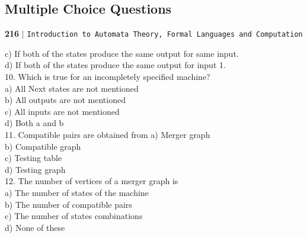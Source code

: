 \documentclass[8pt]{beamer}
\begin{document}
\begin{frame}
\section*{Multiple Choice Questions}
\begin{flushleft}
    \textbf{216}\hspace*{0.1cm} \textbf{$|$} \hspace*{0.1cm} \texttt{Introduction to Automata Theory, Formal Languages and Computation}
  \end{flushleft}

  \vspace*{0.5cm}
\begin{multicols}{2}
\hspace*{0.4cm} c) If both of the states produce the same
output for same input.\\
\hspace*{0.4cm} d) If both of the states produce the same
output for input 1.\\

\vspace*{0.3cm}
10. Which is true for an incompletely specified
machine?\\
\hspace*{0.4cm} a) All Next states are not mentioned\\
\hspace*{0.4cm} b) All outputs are not mentioned\\
\hspace*{0.4cm} c) All inputs are not mentioned\\
\hspace*{0.4cm} d) Both a and b\\

\vspace*{0.3cm}
11. Compatible pairs are obtained from
\hspace*{0.4cm} a) Merger graph\\
\hspace*{0.4cm} b) Compatible graph\\
\hspace*{0.4cm} c) Testing table\\
\hspace*{0.4cm} d) Testing graph\\

\vspace*{0.3cm}
12. The number of vertices of a merger graph is\\
\hspace*{0.4cm} a) The number of states of the machine\\
\hspace*{0.4cm} b) The number of compatible pairs\\
\hspace*{0.4cm} c) The number of states combinations\\
\hspace*{0.4cm} d) None of these\\


\end{multicols}
\end{frame}
\end{document}
